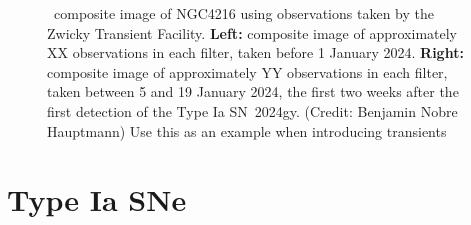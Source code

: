 \documentclass[a4paper,oneside,12pt, class=Latex/Classes/PhDthesisPSnPDF, crop=false]{standalone}
\begin{document}
\begin{figure}
    \caption{\ztfg\ztfr\ztfi\ composite image of NGC4216 using observations taken by the Zwicky Transient Facility. \textbf{Left:} composite image of approximately \color{red}XX \color{black} observations in each filter, taken before 1 January 2024. \textbf{Right:} composite image of approximately \color{red}YY \color{black} observations in each filter, taken between 5 and 19 January 2024, the first two weeks after the first detection of the Type Ia SN~2024gy. (Credit: Benjamin Nobre Hauptmann) \color{red}Use this as an example when introducing transients \color{black}} %
    \label{2024gy_ZTF}
\end{figure}

\section{Type Ia SNe}
\end{document}
